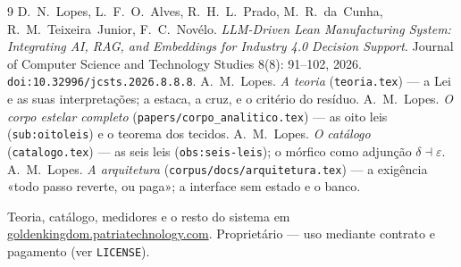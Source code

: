 \documentclass[11pt,a4paper]{article}
\newcommand{\code}[1]{\texttt{\small #1}}
\begin{document}
\begin{thebibliography}{9}
 D.~N.~Lopes, L.~F.~O.~Alves, R.~H.~L.~Prado, M.~R.~da~Cunha, R.~M.~Teixeira~Junior,
F.~C.~Novélo. \emph{LLM-Driven Lean Manufacturing System: Integrating AI, RAG, and Embeddings for
Industry 4.0 Decision Support}. Journal of Computer Science and Technology Studies 8(8): 91--102, 2026.
\code{doi:10.32996/jcsts.2026.8.8.8}.
 A.~M.~Lopes. \emph{A teoria} (\code{teoria.tex}) --- a Lei e as suas interpretações;
a estaca, a cruz, e o critério do resíduo.
 A.~M.~Lopes. \emph{O corpo estelar completo} (\code{papers/corpo\_analitico.tex}) ---
as oito leis (\code{sub:oitoleis}) e o teorema dos tecidos.
 A.~M.~Lopes. \emph{O catálogo} (\code{catalogo.tex}) --- as seis leis
(\code{obs:seis-leis}); o mórfico como adjunção $\delta\dashv\varepsilon$.
 A.~M.~Lopes. \emph{A arquitetura} (\code{corpus/docs/arquitetura.tex}) --- a
exigência «todo passo reverte, ou paga»; a interface sem estado e o banco.
\end{thebibliography}

\vfill
{\footnotesize\color{cinza}\noindent
Teoria, catálogo, medidores e o resto do sistema em
\href{https://goldenkingdom.patriatechnology.com}{goldenkingdom.patriatechnology.com}.
Proprietário --- uso mediante contrato e pagamento (ver \texttt{LICENSE}).\par}
\end{document}
